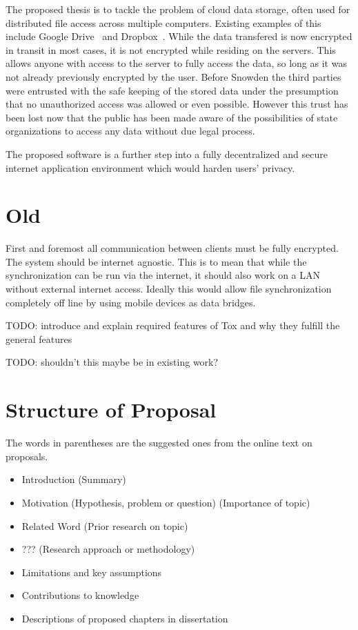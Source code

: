 \documentclass[a4paper,10pt,twoside]{article}
\begin{document}
The proposed thesis is to tackle the problem of cloud data storage, often used for distributed file access across multiple computers.
Existing examples of this include Google Drive~\cite{web:site:gdrive} and Dropbox~\cite{web:site:dropbox}.
While the data transfered is now encrypted in transit in most cases, it is not encrypted while residing on the servers.
This allows anyone with access to the server to fully access the data, so long as it was not already previously encrypted by the user.
Before Snowden the third parties were entrusted with the safe keeping of the stored data under the presumption that no unauthorized access was allowed or even possible.
However this trust has been lost now that the public has been made aware of the possibilities of state organizations to access any data without due legal process.


The proposed software is a further step into a fully decentralized and secure internet application environment which would harden users' privacy.

\section{Old}

First and foremost all communication between clients must be fully encrypted.
The system should be internet agnostic.
This is to mean that while the synchronization can be run via the internet, it should also work on a LAN without external internet access.
Ideally this would allow file synchronization completely off line by using mobile devices as data bridges.

TODO: introduce and explain required features of Tox and why they fulfill the general features

TODO: shouldn’t this maybe be in existing work?

\section{Structure of Proposal}

The words in parentheses are the suggested ones from the online text on proposals.

\begin{itemize}
\item Introduction (Summary)
\item Motivation (Hypothesis, problem or question) (Importance of topic)
\item Related Word (Prior research on topic)
\item ??? (Research approach or methodology)
\item Limitations and key assumptions
\item Contributions to knowledge
\item Descriptions of proposed chapters in dissertation
\end{itemize}

{\small %

}
\end{document}
